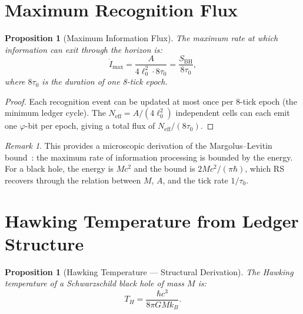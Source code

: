 \documentclass[12pt,a4paper]{article}
\newtheorem{proposition}[theorem]{Proposition}
\theoremstyle{definition}
\theoremstyle{remark}
\newtheorem{remark}[theorem]{Remark}
\begin{document}
\section{Maximum Recognition Flux}
\label{sec:flux}

\begin{proposition}[Maximum Information Flux]
\label{prop:flux}
The maximum rate at which information can exit through the
horizon is:
\begin{equation}
  \dot{I}_{\max} = \frac{A}{4\ell_0^2 \cdot 8\tau_0}
  = \frac{S_{\mathrm{BH}}}{8\tau_0},
  \label{eq:flux}
\end{equation}
where $8\tau_0$ is the duration of one 8-tick epoch.
\end{proposition}

\begin{proof}
Each recognition event can be updated at most once per
8-tick epoch (the minimum ledger cycle).  The
$N_{\mathrm{eff}} = A/(4\ell_0^2)$ independent cells
can each emit one $\varphi$-bit per epoch, giving a total
flux of $N_{\mathrm{eff}}/(8\tau_0)$.
\end{proof}

\begin{remark}
This provides a microscopic derivation of the
Margolus--Levitin bound~\cite{Margolus1998}: the maximum
rate of information processing is bounded by the energy.
For a black hole, the energy is $Mc^2$ and the bound
is $2Mc^2/(\pi\hbar)$, which RS recovers through the
relation between $M$, $A$, and the tick rate $1/\tau_0$.
\end{remark}

\section{Hawking Temperature from Ledger Structure}
\label{sec:temperature}

\begin{proposition}[Hawking Temperature --- Structural Derivation]
\label{thm:temperature}
The Hawking temperature of a Schwarzschild black hole of
mass $M$ is:
\begin{equation}
  T_H = \frac{\hbar c^3}{8\pi G M k_B}.
  \label{eq:hawking}
\end{equation}
\end{proposition}
\end{document}
